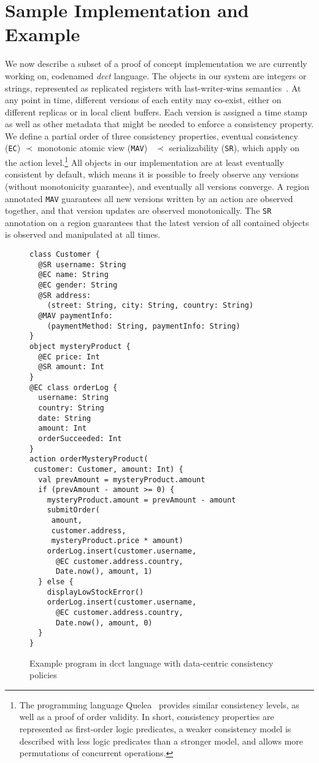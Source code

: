 \documentclass[preprint,numbers]{sigplanconf}
\begin{document}
\section{Sample Implementation and Example}
\label{sec:example}
We now describe a subset of a proof of concept implementation we are currently
working on, codenamed \emph{dcct} language.
The objects in our system are integers or strings,
represented as replicated registers with last-writer-wins
semantics~\cite{burckhardt2014replicated}. At any point in time, different
versions of each entity may
co-exist, either on different replicas or in local client buffers. Each version
is assigned a time stamp as well as other metadata that might be needed to
enforce a consistency property. We define a partial order of three consistency properties, eventual
consistency (\texttt{EC}) $\prec$ monotonic atomic view (\texttt{MAV})~\cite{bailis2013highly}  $\prec$
serializability (\texttt{SR}), which apply on the action level.\footnote{The programming language Quelea~\cite{sivaramakrishnan2015declarative} provides similar
consistency levels, as well as a proof of order validity. In short, consistency
properties are represented as first-order logic predicates, a weaker consistency
model is described with less logic predicates than a stronger model, and allows
more permutations of concurrent operations.} 
All objects in our implementation are at least eventually consistent by default, which means it
is possible to freely observe any versions (without monotonicity guarantee), and
eventually all versions converge. A region annotated \texttt{MAV} guarantees all new versions written by an
action are observed together, and that version updates are observed
monotonically. The \texttt{SR} annotation on a
region guarantees that the latest version of all
contained objects is observed and manipulated at all times. 

\begin{figure}[t!] 
\begin{lstlisting}[basicstyle=\small\ttfamily]
class Customer {
  @SR username: String
  @EC name: String
  @EC gender: String
  @SR address: 
    (street: String, city: String, country: String) 
  @MAV paymentInfo:
    (paymentMethod: String, paymentInfo: String)
}
object mysteryProduct {
  @EC price: Int
  @SR amount: Int
}
@EC class orderLog {
  username: String
  country: String
  date: String
  amount: Int
  orderSucceeded: Int
}
action orderMysteryProduct(
 customer: Customer, amount: Int) {
  val prevAmount = mysteryProduct.amount
  if (prevAmount - amount >= 0) {
    mysteryProduct.amount = prevAmount - amount
    submitOrder(
     amount, 
     customer.address, 
     mysteryProduct.price * amount)
    orderLog.insert(customer.username, 
      @EC customer.address.country, 
      Date.now(), amount, 1)
  } else {
    displayLowStockError() 
    orderLog.insert(customer.username, 
      @EC customer.address.country, 
      Date.now(), amount, 0)
  }
}
\end{lstlisting}
\caption{Example program in dcct language with data-centric consistency policies}
\label{fig:example}
\end{figure}
\end{document}
